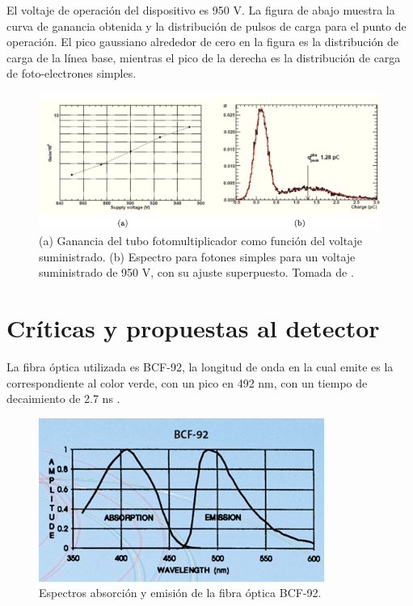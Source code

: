 \documentclass[a4paper,10pt]{article}
\numberwithin{equation}{section}
\begin{document}
El voltaje de operación del dispositivo es 950 V. La figura de abajo muestra la curva 
de ganancia obtenida y la distribución de pulsos de carga para el punto de operación. 
El pico gaussiano alrededor de cero en la figura es la distribución de carga de la 
línea base, mientras el pico de la derecha es la distribución de carga de foto-electrones 
simples. 

\begin{figure}[H]
 \center 
 \includegraphics[scale=0.5]{fig6}
 \caption{(a) Ganancia del tubo fotomultiplicador como función del voltaje 
 suministrado. (b) Espectro para fotones simples para un voltaje suministrado de 
 950 V, con su ajuste superpuesto. Tomada de \cite{trovato}.}
\end{figure}

\section{Críticas y propuestas al detector}

La fibra óptica utilizada es BCF-92, la longitud de onda en la cual emite es la 
correspondiente al color verde, con un pico en 492 nm, con un tiempo de decaimiento 
de 2.7 ns \cite{saint}. 


\begin{figure}[H]
 \center 
 \includegraphics[scale=0.8]{fig7}
 \caption{Espectros absorción y emisión de la fibra óptica BCF-92.}
\end{figure}
\end{document}
